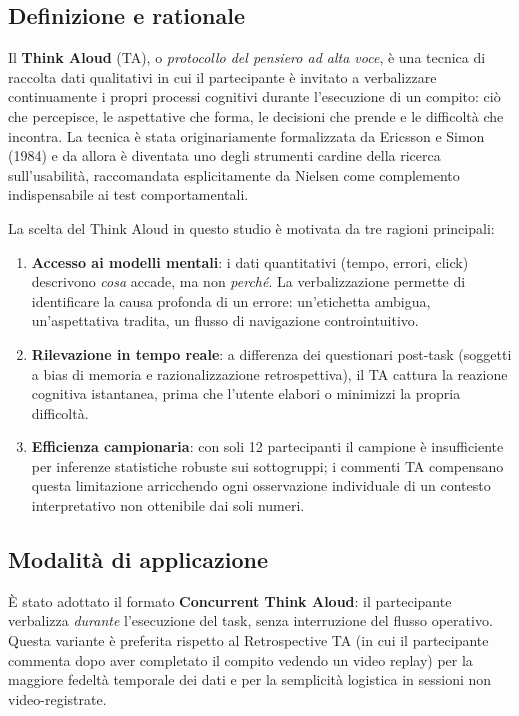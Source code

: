 \subsection{Definizione e rationale}
Il \textbf{Think Aloud} (TA), o \textit{protocollo del pensiero ad alta voce}, è una tecnica di raccolta dati qualitativi in cui il partecipante è invitato a verbalizzare continuamente i propri processi cognitivi durante l'esecuzione di un compito: ciò che percepisce, le aspettative che forma, le decisioni che prende e le difficoltà che incontra. La tecnica è stata originariamente formalizzata da Ericsson e Simon (1984) e da allora è diventata uno degli strumenti cardine della ricerca sull'usabilità, raccomandata esplicitamente da Nielsen come complemento indispensabile ai test comportamentali.

La scelta del Think Aloud in questo studio è motivata da tre ragioni principali:
\begin{enumerate}
    \item \textbf{Accesso ai modelli mentali}: i dati quantitativi (tempo, errori, click) descrivono \emph{cosa} accade, ma non \emph{perché}. La verbalizzazione permette di identificare la causa profonda di un errore: un'etichetta ambigua, un'aspettativa tradita, un flusso di navigazione controintuitivo.
    \item \textbf{Rilevazione in tempo reale}: a differenza dei questionari post-task (soggetti a bias di memoria e razionalizzazione retrospettiva), il TA cattura la reazione cognitiva istantanea, prima che l'utente elabori o minimizzi la propria difficoltà.
    \item \textbf{Efficienza campionaria}: con soli 12 partecipanti il campione è insufficiente per inferenze statistiche robuste sui sottogruppi; i commenti TA compensano questa limitazione arricchendo ogni osservazione individuale di un contesto interpretativo non ottenibile dai soli numeri.
\end{enumerate}

\subsection{Modalità di applicazione}
È stato adottato il formato \textbf{Concurrent Think Aloud}: il partecipante verbalizza \emph{durante} l'esecuzione del task, senza interruzione del flusso operativo. Questa variante è preferita rispetto al Retrospective TA (in cui il partecipante commenta dopo aver completato il compito vedendo un video replay) per la maggiore fedeltà temporale dei dati e per la semplicità logistica in sessioni non video-registrate.

